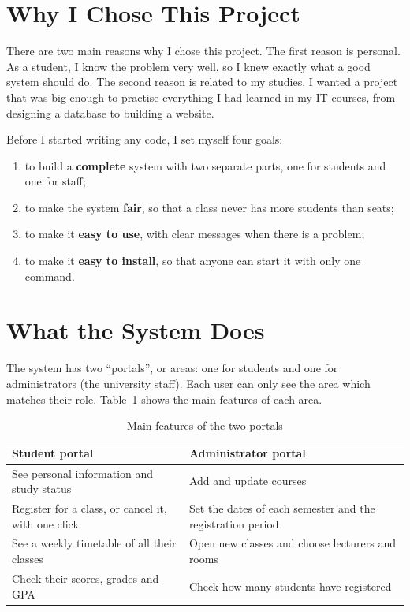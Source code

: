 \documentclass[12pt,a4paper]{article}
\begin{document}
\section{Why I Chose This Project}

There are two main reasons why I chose this project. The first reason is
personal. As a student, I know the problem very well, so I knew exactly what a
good system should do. The second reason is related to my studies. I wanted a
project that was big enough to practise everything I had learned in my IT
courses, from designing a database to building a website.

Before I started writing any code, I set myself four goals:
\begin{enumerate}[leftmargin=1.6em]
  \item to build a \textbf{complete} system with two separate parts, one for
        students and one for staff;
  \item to make the system \textbf{fair}, so that a class never has more
        students than seats;
  \item to make it \textbf{easy to use}, with clear messages when there is a
        problem;
  \item to make it \textbf{easy to install}, so that anyone can start it with
        only one command.
\end{enumerate}

\section{What the System Does}

The system has two ``portals'', or areas: one for students and one for
administrators (the university staff). Each user can only see the area which
matches their role. Table~\ref{tab:features} shows the main features of each
area.

\begin{table}[H]
\centering
\renewcommand{\arraystretch}{1.3}
\small
\begin{tabularx}{\textwidth}{X X}
\toprule
\textbf{\color{primary}Student portal} & \textbf{\color{primary}Administrator portal} \\
\midrule
See personal information and study status &
Add and update courses \\
Register for a class, or cancel it, with one click &
Set the dates of each semester and the registration period \\
See a weekly timetable of all their classes &
Open new classes and choose lecturers and rooms \\
Check their scores, grades and GPA &
Check how many students have registered \\
\bottomrule
\end{tabularx}
\caption{Main features of the two portals}
\label{tab:features}
\end{table}
\end{document}
